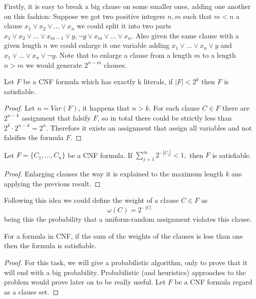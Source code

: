 Firstly, it is easy to break a big clause on some smaller ones, adding one another on this fashion: Suppose we got two positive integers $n,m$ such that $m < n$ a clause $x_1\vee x_2 \vee ... \vee x_n$ we could split it into two parts $x_1\vee x_2  \vee ... \vee x_{m-1} \vee y, \neg y \vee x_m \vee ... \vee x_n$. Also given the same clause with a given length $n$ we could enlarge it one variable adding $ x_1 \vee ... \vee x_n \vee y$ and $ x_1 \vee ... \vee x_n \vee \neg y$. Note that to enlarge a clause from a length $m$ to a length $n>m$ we would generate $2^{n-m}$ clauses.


\begin{proposition}
	Let $F$ be a CNF formula which has exactly k literals, if $|F| < 2^k$ then $F$ is satisfiable.
\end{proposition}
\begin{proof}
	Let $n = Var(F)$, it happens that $n > k$. For each clause $C \in F$ there are $2^{n-k}$ assignment that falsify $F$, so in total there could be strictly less than $2^k \cdot 2^{n-k} = 2^n.$ Therefore it exists an assignment that assign all variables and not falsifies the formula $F$.
\end{proof}
\begin{proposition}
	Let $F=\{C_1,...,C_n\}$ be a CNF formula. If $\sum_{j=1}^m 2^{-|C_j|}<1,$ then $F$ is satisfiable.
\end{proposition}
\begin{proof}
	Enlarging clauses the way it is explained to the maximum length $k$ ans applying the previous result.
\end{proof}

Following this idea we could define the weight of a clause $C\in F$ as $$\omega(C) = 2^{-|C|} $$
being this the probability that a uniform-random assignment violates this clause. 

\begin{corollary}
	For a formula in CNF, if the sum of the weights of the clauses is less than one then the formula is satisfiable.
\end{corollary}


\begin{proof}
For this task, we will give a probabilistic algorithm, only to prove that it will end with a big probability. Probabilistic (and heuristics) approaches to the problem would prove later on to be really useful. Let $F$ be a CNF formula regard as a clause set.
\end{proof}



